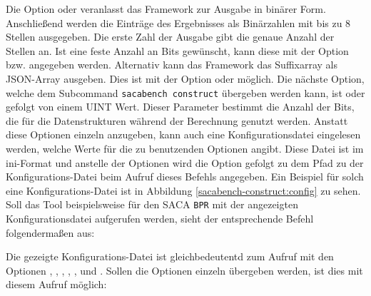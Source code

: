 {Die Option  oder  veranlasst das Framework zur Ausgabe in bin{\"a}rer Form.
Anschlie{\ss}end werden die Eintr{\"a}ge des Ergebnisses als Bin{\"a}rzahlen mit bis zu 8 Stellen ausgegeben. 
Die erste Zahl der Ausgabe gibt die genaue Anzahl der Stellen an.
Ist eine feste Anzahl an Bits gew{\"u}nscht, kann diese mit der Option  bzw.  angegeben werden.
Alternativ kann das Framework das Suffixarray als JSON-Array ausgeben. 
Dies ist mit der Option  oder  möglich.
Die nächste Option, welche dem Subcommand \texttt{sacabench construct} {\"u}bergeben werden kann, ist  oder  gefolgt von einem UINT Wert. 
Dieser Parameter bestimmt die Anzahl der Bits, die f{\"u}r die Datenstrukturen w{\"a}hrend der Berechnung genutzt werden.
Anstatt diese Optionen einzeln anzugeben, kann auch eine Konfigurationsdatei eingelesen werden, welche Werte für die zu benutzenden Optionen angibt.
Diese Datei ist im ini-Format und anstelle der Optionen wird die Option  gefolgt zu dem Pfad zu der Konfigurations-Datei beim Aufruf dieses Befehls angegeben.
Ein Beispiel für solch eine Konfigurations-Datei ist in Abbildung \ref{sacabench-construct:config} zu sehen.
Soll das Tool beispielsweise für den SACA \texttt{BPR} mit der angezeigten Konfigurationsdatei aufgerufen werden, sieht der entsprechende Befehl folgendermaßen aus:


Die gezeigte Konfigurations-Datei ist gleichbedeutentd zum Aufruf mit den Optionen , , , , ,  und .
Sollen die Optionen einzeln übergeben werden, ist dies mit diesem Aufruf möglich:

\par
}

